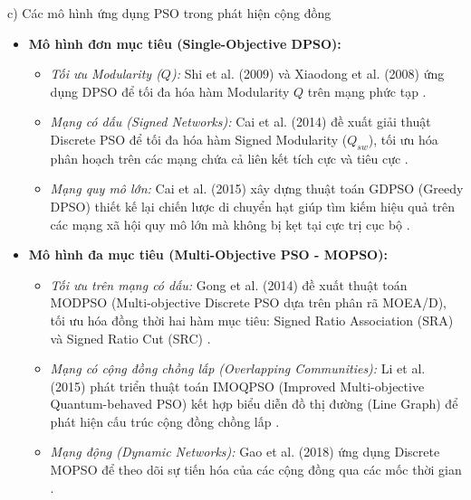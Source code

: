 \documentclass[14pt,a4paper]{extarticle}
\begin{document}
\noindent c) Các mô hình ứng dụng PSO trong phát hiện cộng đồng
\begin{itemize}
    \item \textbf{Mô hình đơn mục tiêu (Single-Objective DPSO):}
    \begin{itemize}
        \item \textit{Tối ưu Modularity ($Q$):} Shi et al. (2009) và Xiaodong et al. (2008) ứng dụng DPSO để tối đa hóa hàm Modularity $Q$ trên mạng phức tạp \cite{Baraa2021, Gong2016}.
        \item \textit{Mạng có dấu (Signed Networks):} Cai et al. (2014) đề xuất giải thuật Discrete PSO để tối đa hóa hàm Signed Modularity ($Q_{sw}$), tối ưu hóa phân hoạch trên các mạng chứa cả liên kết tích cực và tiêu cực \cite{Baraa2021, Gong2016}.
        \item \textit{Mạng quy mô lớn:} Cai et al. (2015) xây dựng thuật toán GDPSO (Greedy DPSO) thiết kế lại chiến lược di chuyển hạt giúp tìm kiếm hiệu quả trên các mạng xã hội quy mô lớn mà không bị kẹt tại cực trị cục bộ \cite{Baraa2021, Beldi2025}.
    \end{itemize}
    \item \textbf{Mô hình đa mục tiêu (Multi-Objective PSO - MOPSO):}
    \begin{itemize}
        \item \textit{Tối ưu trên mạng có dấu:} Gong et al. (2014) đề xuất thuật toán MODPSO (Multi-objective Discrete PSO dựa trên phân rã MOEA/D), tối ưu hóa đồng thời hai hàm mục tiêu: Signed Ratio Association (SRA) và Signed Ratio Cut (SRC) \cite{Baraa2021}.
        \item \textit{Mạng có cộng đồng chồng lấp (Overlapping Communities):} Li et al. (2015) phát triển thuật toán IMOQPSO (Improved Multi-objective Quantum-behaved PSO) kết hợp biểu diễn đồ thị đường (Line Graph) để phát hiện cấu trúc cộng đồng chồng lấp \cite{Baraa2021}.
        \item \textit{Mạng động (Dynamic Networks):} Gao et al. (2018) ứng dụng Discrete MOPSO để theo dõi sự tiến hóa của các cộng đồng qua các mốc thời gian \cite{Baraa2021}.
    \end{itemize}
\end{itemize}
\end{document}
